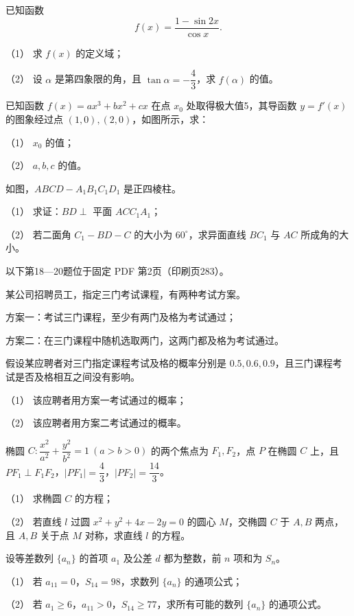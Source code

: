 \begin{question}
已知函数
\nopagebreak[4]
\[
f(x)=\frac{1-\sin 2x}{\cos x}.
\]

（1） 求 $f(x)$ 的定义域；

（2） 设 $\alpha$ 是第四象限的角，且 $\tan\alpha=-\dfrac43$，求 $f(\alpha)$ 的值。

\Needspace{0.4\textheight}
\end{question}
\begin{question}
已知函数 $f(x)=ax^3+bx^2+cx$ 在点 $x_0$ 处取得极大值5，其导函数 $y=f'(x)$ 的图象经过点 $(1,0),(2,0)$，如图所示，求：

（1） $x_0$ 的值；

（2） $a,b,c$ 的值。
\nopagebreak[4]
\begin{center}\end{center}
\nopagebreak[4]
\Needspace{0.4\textheight}
\end{question}
\begin{question}
如图，$ABCD-A_1B_1C_1D_1$ 是正四棱柱。

（1） 求证：$BD\perp$ 平面 $ACC_1A_1$；

（2） 若二面角 $C_1-BD-C$ 的大小为 $60^\circ$，求异面直线 $BC_1$ 与 $AC$ 所成角的大小。
\nopagebreak[4]
\begin{center}\end{center}
\nopagebreak[4]
\begin{gktip}
以下第18—20题位于固定 PDF 第2页（印刷页283）。
\end{gktip}

\end{question}
\begin{question}
某公司招聘员工，指定三门考试课程，有两种考试方案。

方案一：考试三门课程，至少有两门及格为考试通过；

方案二：在三门课程中随机选取两门，这两门都及格为考试通过。

假设某应聘者对三门指定课程考试及格的概率分别是 $0.5,0.6,0.9$，且三门课程考试是否及格相互之间没有影响。

（1） 该应聘者用方案一考试通过的概率；

（2） 该应聘者用方案二考试通过的概率。

\end{question}
\begin{question}
椭圆 $C:\dfrac{x^2}{a^2}+\dfrac{y^2}{b^2}=1\ (a>b>0)$ 的两个焦点为 $F_1,F_2$，点 $P$ 在椭圆 $C$ 上，且 $PF_1\perp F_1F_2$，$|PF_1|=\dfrac43$，$|PF_2|=\dfrac{14}3$。

（1） 求椭圆 $C$ 的方程；

（2） 若直线 $l$ 过圆 $x^2+y^2+4x-2y=0$ 的圆心 $M$，交椭圆 $C$ 于 $A,B$ 两点，且 $A,B$ 关于点 $M$ 对称，求直线 $l$ 的方程。

\end{question}
\begin{question}
设等差数列 $\{a_n\}$ 的首项 $a_1$ 及公差 $d$ 都为整数，前 $n$ 项和为 $S_n$。

（1） 若 $a_{11}=0$，$S_{14}=98$，求数列 $\{a_n\}$ 的通项公式；

（2） 若 $a_1\ge 6$，$a_{11}>0$，$S_{14}\ge 77$，求所有可能的数列 $\{a_n\}$ 的通项公式。

\par\medskip

\end{question}